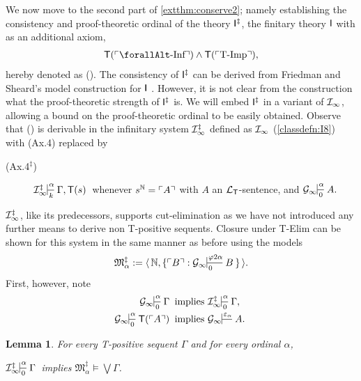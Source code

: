 \documentclass[UKenglish,cleveref,DIV=12]{scrartcl}
\let\forall\forallAlt
\newtheorem{lemma}{Lemma}
\theoremstyle{definition}
\theoremstyle{definition}
\begin{document}
We now move to the second part of \cref{extthm:conserve2}; namely establishing the consistency and proof-theoretic
ordinal of the theory $\mathsf{I}^\ddag$, the finitary theory $\mathsf{I}$ with as an additional
axiom,
\begin{align*}
  \T(\gn{\text{$\forall$-Inf}})\land \T(\gn{\text{T-Imp}}),
\end{align*}
hereby denoted as (\ddag). The consistency of $\mathsf{I}^\ddag$ can be derived from Friedman and Sheard's model construction for $\mathsf{I}$ {\cite[\S3]{FS87}}. However, it is not clear from the construction what the proof-theoretic strength of $\mathsf{I}^\ddag$ is. We will embed $\mathsf{I}^\ddag$ in a variant of $\mathcal{I}_\infty$, allowing a bound on the proof-theoretic ordinal to be easily obtained. Observe that (\ddag) is derivable in the infinitary system $\mathcal{I}_\infty^\ddag$ defined as $\mathcal{I}_\infty$ (\cref{classdefn:I8}) with (Ax.4) replaced by
\begin{description}
 \item [\normalfont(Ax.4$^\ddag$)] $\Iinfty^\ddag\prov\alpha k{\Gamma,\T(s)}$ whenever $s^{\mathbb N}=\ulcorner{A}\urcorner$ with $A$  an $\mathcal{L}_{\mathsf{T}}$-sentence, and $\Ginfty\prov\alpha0{A.}$
\end{description}
$\mathcal{I}_\infty^\ddag$, like its predecessors, supports cut-elimination as we have not
introduced any further means to derive non T-positive sequents. Closure under
T-Elim can be shown for this system in the same manner as before using the
models
\begin{align*}
  \mathfrak M^{\ddag}_\alpha:=\pair{\N,\{\gn B:\Ginfty\prov{\varphi2\alpha}0B\}}.
\end{align*}
First, however, note %
\begin{align*}
  \Ginfty\prov\alpha0\Gamma&\text{ implies }\Iinfty^\ddag\prov\alpha0{\Gamma,}\\
  \Ginfty\prov\alpha0{\T(\gn A)}&\text{ implies }\Ginfty\prov{\varepsilon_\alpha}{}{A.}
\end{align*}
\begin{lemma}\label{extprop:I8TElim}
For every T-positive sequent $\Gamma$ and for every ordinal $\alpha$,
\begin{center}
	$\Iinfty^\ddag\prov\alpha0\Gamma$ implies $\mathfrak{M}^\ddag_\alpha\models\textstyle\bigvee\Gamma$.
\end{center}
\end{lemma}
\end{document}
